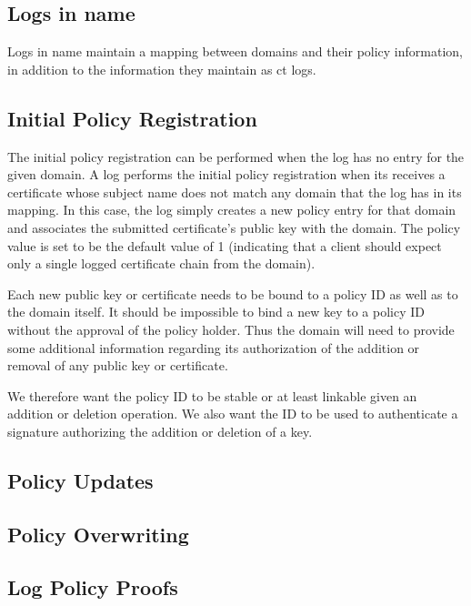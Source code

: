 \subsection{Logs in \ac{name}}

Logs in \ac{name} maintain a mapping between domains and their policy
information, in addition to the information they maintain as \ac{ct} logs.

\subsection{Initial Policy Registration}

The initial policy registration can be performed when the log has no entry for
the given domain. A log performs the initial policy registration when its
receives a certificate whose subject name does not match any domain that the log
has in its mapping. In this case, the log simply creates a new policy entry for
that domain and associates the submitted certificate's public key with the
domain. The policy value is set to be the default value of 1 (indicating that
a client should expect only a single logged certificate chain from the domain).

Each new public key or certificate needs to be bound to a policy ID as well as
to the domain itself. It should be impossible to bind a new key to a policy ID
without the approval of the policy holder. Thus the domain will need to provide
some additional information regarding its authorization of the addition or
removal of any public key or certificate.

We therefore want the policy ID to be stable or at least linkable given an
addition or deletion operation. We also want the ID to be used to authenticate
a signature authorizing the addition or deletion of a key.

\subsection{Policy Updates}


\subsection{Policy Overwriting}

\subsection{Log Policy Proofs}


